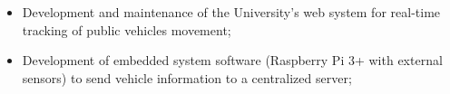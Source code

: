 
\begin{itemize}
  \item Development and maintenance of the University's web system for real-time tracking of public vehicles movement;
  \item Development of embedded system software (Raspberry Pi 3+ with external sensors) to send vehicle information to a centralized server;
\end{itemize}
